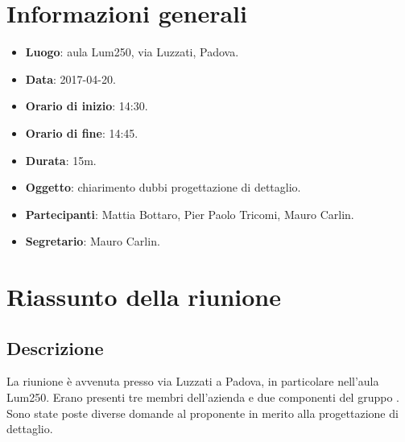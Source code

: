 \documentclass[a4paper,titlepage]{article}
\begin{document}
\maketitle
\begin{diario}
\end{diario}
\newpage
\tableofcontents

\newpage
\section{Informazioni generali}
\label{sec:Informazioni}

\begin{itemize}
  \item \textbf{Luogo}: aula Lum250, via Luzzati, Padova.
  \item \textbf{Data}: 2017-04-20.
  \item \textbf{Orario di inizio}: 14:30.
  \item \textbf{Orario di fine}: 14:45.
  \item \textbf{Durata}: 15m.
  \item \textbf{Oggetto}: chiarimento dubbi progettazione di dettaglio.
  \item \textbf{Partecipanti}: Mattia Bottaro, Pier Paolo Tricomi, Mauro Carlin.
  \item \textbf{Segretario}: Mauro Carlin.

\end{itemize}
\section{Riassunto della riunione}
\label{sec:RiassuntoRiunione}
 \subsection{Descrizione}
La riunione è avvenuta presso via Luzzati a Padova, in particolare nell'aula Lum250. Erano presenti tre membri dell'azienda  e due componenti del gruppo \GRUPPO{}. Sono state poste diverse domande al proponente in merito alla progettazione di dettaglio.
\end{document}
